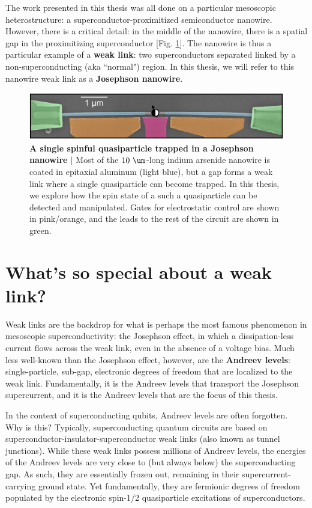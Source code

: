 The work presented in this thesis was all done on a particular mesoscopic heterostructure: a superconductor\hyp{}proximitized semiconductor nanowire. 
However, there is a critical detail: in the middle of the nanowire, there is a spatial gap in the proximitizing superconductor [Fig. \ref{intro_fig}]. 
The nanowire is thus a particular example of a \textbf{weak link}: two superconductors separated linked by a non\hyp{}superconducting (aka ``normal") region.  
In this thesis, we will refer to this nanowire weak link as a \textbf{Josephson nanowire}.

\begin{figure}
    \centering
    \includegraphics[width = \textwidth]{Chapters/1-intro_fig.pdf}
    \caption[A single spinful quasiparticle trapped in a Josephson nanowire]{\textbf{A single spinful quasiparticle trapped in a Josephson nanowire $\rvert$ }
    Most of the $10~\um$\hyp{}long indium arsenide nanowire is coated in epitaxial aluminum (light blue), but a gap forms a weak link where a single quasiparticle can become trapped.  
    In this thesis, we explore how the spin state of a such a quasiparticle can be detected and manipulated. 
    Gates for electrostatic control are shown in pink/orange, and the leads to the rest of the circuit are shown in green. 
    }
    \label{intro_fig}
\end{figure}

\section{What's so special about a weak link?}

Weak links are the backdrop for what is perhaps the most famous phenomenon in mesoscopic superconductivity: the Josephson effect, in which a dissipation\hyp{}less current flows across the weak link, even in the absence of a voltage bias.
Much less well\hyp{}known than the Josephson effect, however, are the \textbf{Andreev levels}: single-particle, sub-gap, electronic degrees of freedom that are localized to the weak link. 
Fundamentally, it is the Andreev levels that transport the Josephson supercurrent, and it is the Andreev levels that are the focus of this thesis. 

In the context of superconducting qubits, Andreev levels are often forgotten. 
Why is this? 
Typically, superconducting quantum circuits are based on superconductor-insulator-superconductor weak links (also known as tunnel junctions). 
While these weak links possess millions of Andreev levels, the energies of the Andreev levels are very close to (but always below) the superconducting gap. 
As such, they are essentially frozen out, remaining in their supercurrent\hyp{}carrying ground state.
Yet fundamentally, they are fermionic degrees of freedom populated by the electronic spin-1/2 quasiparticle excitations of superconductors.

